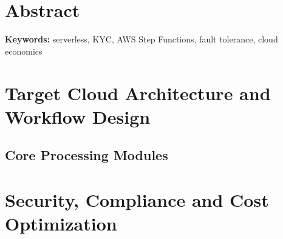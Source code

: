 \documentclass[12pt,a4paper]{article}
\renewcommand{\cftsecpresnum}{Section~}
\begin{document}
\section*{Abstract}

\noindent\textbf{Keywords:} serverless, KYC, AWS Step Functions, fault tolerance, cloud economics
\clearpage




\section{Target Cloud Architecture and Workflow Design}\label{sec:arch}


\subsection{Core Processing Modules}\label{sec:modules}






\section{Security, Compliance and Cost Optimization}\label{sec:seccost}






\clearpage
\nocite{*}
\renewcommand{\refname}{References}



\clearpage
\appendix
{}
\addtocontents{toc}{\protect\renewcommand{\protect\cftsecpresnum}{Appendix~}}

\end{document}
